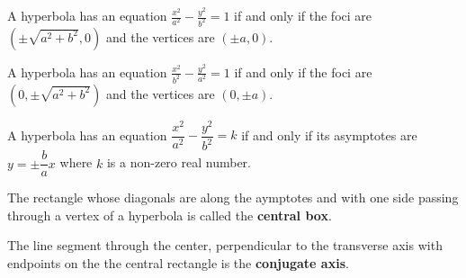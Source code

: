\begin{theorem}
    A hyperbola has an equation $\frac{x^2}{a^2}-\frac{y^2}{b^2}=1$ if and only if the foci are $(\pm \sqrt{a^2+b^2}, 0)$ and the vertices are $(\pm a, 0)$.
\end{theorem}

\begin{theorem}
    A hyperbola has an equation $\frac{x^2}{b^2}-\frac{y^2}{a^2}=1$ if and only if the foci are $(0, \pm \sqrt{a^2+b^2})$ and the vertices are $(0, \pm a)$.
\end{theorem}




\begin{proposition}
    A hyperbola has an equation $\dfrac{x^2}{a^2}-\dfrac{y^2}{b^2}=k$ if and only if its asymptotes are $y=\pm\dfrac{b}{a}x$ where $k$ is a non-zero real number.
\end{proposition}

\begin{definition}
  The rectangle whose diagonals are along the aymptotes and with one side passing through a vertex of a hyperbola is called the \textbf{central box}.
  
  The line segment through the center, perpendicular to the transverse axis with endpoints on the the central rectangle is the \textbf{conjugate axis}. 
\end{definition}



